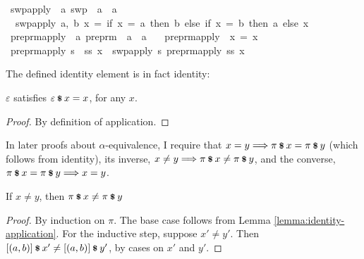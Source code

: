 \begin{implementation}
\isamarkupfalse%
\ swp{\isacharunderscore}apply\ {\isacharcolon}{\isacharcolon}\ {\isachardoublequoteopen}{\isacharprime}a\ swp\ {\isasymRightarrow}\ {\isacharprime}a\ {\isasymRightarrow}\ {\isacharprime}a{\isachardoublequoteclose}\ \isanewline
\ \ {\isachardoublequoteopen}swp{\isacharunderscore}apply\ {\isacharparenleft}a,\ b{\isacharparenright}\ x\ =\ {\isacharparenleft}if\ x\ =\ a\ then\ b\ else\ {\isacharparenleft}if\ x\ =\ b\ then\ a\ else\ x{\isacharparenright}{\isacharparenright}{\isachardoublequoteclose}\isanewline
\isanewline
{}\isamarkupfalse%
\ preprm{\isacharunderscore}apply\ {\isacharcolon}{\isacharcolon}\ {\isachardoublequoteopen}{\isacharprime}a\ preprm\ {\isasymRightarrow}\ {\isacharprime}a\ {\isasymRightarrow}\ {\isacharprime}a{\isachardoublequoteclose}\ \isanewline
\ \ {\isachardoublequoteopen}preprm{\isacharunderscore}apply\ {\isacharbrackleft}{\isacharbrackright}\ x\ =\ x{\isachardoublequoteclose}\isanewline
{\isacharbar}\ {\isachardoublequoteopen}preprm{\isacharunderscore}apply\ {\isacharparenleft}s\ {\isacharhash}\ ss{\isacharparenright}\ x\ {\isacharequal}\ swp{\isacharunderscore}apply\ s\ {\isacharparenleft}preprm{\isacharunderscore}apply\ ss\ x{\isacharparenright}{\isachardoublequoteclose}
\end{implementation}

The defined identity element is in fact identity:

\begin{lemma}
\label{lemma:identity-application}
\(\varepsilon\) satisfies \(\varepsilon \mathbin{\textrm{\footnotesize{\textbf{\$}}}} x = x\), for any \(x\).
\end{lemma}
\begin{proof}
By definition of application.
\end{proof}

In later proofs about \(\alpha\)-equivalence, I require that \(x = y \Longrightarrow \pi \mathbin{\textrm{\footnotesize{\textbf{\$}}}} x = \pi \mathbin{\textrm{\footnotesize{\textbf{\$}}}} y\) (which follows from identity), its inverse, \(x \neq y \Longrightarrow \pi \mathbin{\textrm{\footnotesize{\textbf{\$}}}} x \neq \pi \mathbin{\textrm{\footnotesize{\textbf{\$}}}} y\), and the converse, \(\pi \mathbin{\textrm{\footnotesize{\textbf{\$}}}} x = \pi \mathbin{\textrm{\footnotesize{\textbf{\$}}}} y \Longrightarrow x = y\).

\begin{lemma}
\label{lemma:apply-unequal}
If \(x \neq y\), then \(\pi \mathbin{\textrm{\footnotesize{\textbf{\$}}}} x \neq \pi \mathbin{\textrm{\footnotesize{\textbf{\$}}}} y\)
\end{lemma}
\begin{proof}
By induction on \(\pi\).
The base case follows from Lemma \ref{lemma:identity-application}.
For the inductive step, suppose \(x' \neq y'\).
Then \([\left(a, b\right)] \mathbin{\textrm{\footnotesize{\textbf{\$}}}} x' \neq [\left(a, b\right)] \mathbin{\textrm{\footnotesize{\textbf{\$}}}} y'\), by cases on \(x'\) and \(y'\).
\end{proof}

